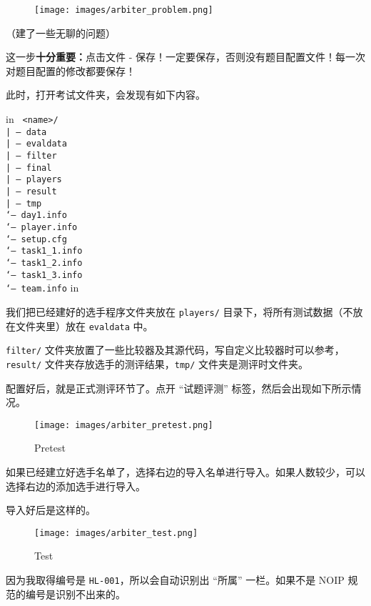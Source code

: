 \begin{figure}[h]
\centering
\texttt{[image: images/arbiter\_problem.png]} 

\end{figure}

（建了一些无聊的问题）

这一步\textbf{十分重要：}点击文件 - 保存！一定要保存，否则没有题目配置文件！每一次对题目配置的修改都要保存！

此时，打开考试文件夹，会发现有如下内容。

 in
\texttt{
<name>/\\| -- data\\| -- evaldata\\| -- filter\\| -- final\\| -- players\\| -- result\\| -- tmp\\`-- day1.info\\`-- player.info\\`-- setup.cfg\\`-- task1_1.info\\`-- task1_2.info\\`-- task1_3.info\\`-- team.info}
 in

我们把已经建好的选手程序文件夹放在 \texttt{players/} 目录下，将所有测试数据（不放在文件夹里）放在 \texttt{evaldata} 中。

\texttt{filter/} 文件夹放置了一些比较器及其源代码，写自定义比较器时可以参考，\texttt{result/} 文件夹存放选手的测评结果，\texttt{tmp/} 文件夹是测评时文件夹。

配置好后，就是正式测评环节了。点开 “试题评测” 标签，然后会出现如下所示情况。

\begin{figure}[h]
\centering
\texttt{[image: images/arbiter\_pretest.png]} 
\caption{Pretest}
\end{figure}

如果已经建立好选手名单了，选择右边的导入名单进行导入。如果人数较少，可以选择右边的添加选手进行导入。

导入好后是这样的。

\begin{figure}[h]
\centering
\texttt{[image: images/arbiter\_test.png]} 
\caption{Test}
\end{figure}

因为我取得编号是 \texttt{HL-001}，所以会自动识别出 “所属” 一栏。如果不是 NOIP 规范的编号是识别不出来的。

